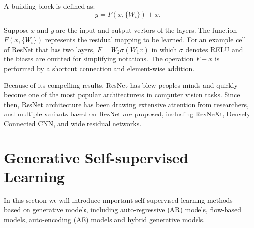 \documentclass[conference]{IEEEtran}
\begin{document}
A building block is defined as:
\begin{equation}
    y = F(x, \{W_i\})+x.
\end{equation}

Suppose $x$ and $y$ are the input and output vectors of the layers.
The function $F(x, \{W_i\})$ represents the residual mapping to be learned.
For an example cell of ResNet that has two layers, $F=W_2\sigma(W_1x)$ in which $\sigma$ denotes RELU and the biases are omitted for simplifying notations.
The operation $F+x$ is performed by a shortcut connection and element-wise addition.

Because of its compelling results, ResNet has blew peoples minds and quickly become one of the most popular architecturers in computer vision tasks. Since then, ResNet architecture has been drawing extensive attention from researchers, 
and multiple variants based on ResNet are proposed, including ResNeXt, Densely Connected CNN, and wide residual networks.

\section{Generative Self-supervised Learning}
In this section we will introduce important self-supervised learning methods based on generative models, including auto-regressive (AR) models, flow-based models, auto-encoding (AE) models and hybrid generative models.



\end{document}
